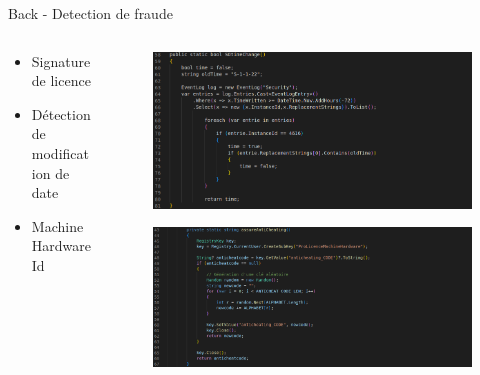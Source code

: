 \documentclass{cubeamer}
\begin{document}
\begin{frame}{Back - Detection de fraude}
    \begin{columns}

        \begin{column}{.5\textwidth}
            \begin{itemize}
                \item Signature de licence
                \item Détection de modification de date
                \item Machine HardwareId
            \end{itemize}
        \end{column}

        \begin{column}{.5\textwidth}
            \begin{figure}
                \includegraphics[scale=0.2]{img/logs.png}
            \end{figure}
            \begin{figure}
                \includegraphics[scale=0.15]{img/detec.png}
            \end{figure}
        \end{column}

    \end{columns}
\end{frame}
\end{document}

